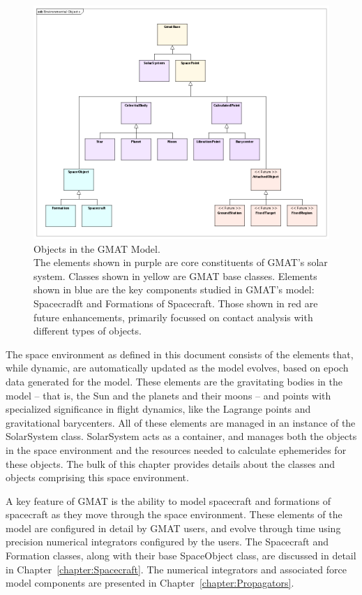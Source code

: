 \begin{figure}[htb]
\begin{center}
\includegraphics[440,347]{Images/EnvironmentalObjects.png}
\caption[Objects in the GMAT Model]{\label{figure:EnvironmentalObjects}Objects in the GMAT
Model.\\The elements shown in purple are core constituents of GMAT's solar system.  Classes
shown in yellow are GMAT base classes.  Elements shown in blue are the key components
studied in GMAT's model: Spacecradft and Formations of Spacecraft.  Those shown in red are future
enhancements, primarily focussed on contact analysis with different types of objects.}
\end{center}
\end{figure}

The space environment as defined in this document consists of the elements that, while dynamic, are
automatically updated as the model evolves, based on epoch data generated for the model.  These
elements are the gravitating bodies in the model -- that is, the Sun and the planets and their moons
-- and points with specialized significance in flight dynamics, like the Lagrange points and
gravitational barycenters.  All of these elements are managed in an instance of the SolarSystem
class. SolarSystem acts as a container, and manages both the objects in the space environment and
the resources needed to calculate ephemerides for these objects.  The bulk of this chapter provides
details about the classes and objects comprising this space environment.

A key feature of GMAT is the ability to model spacecraft and formations of spacecraft as they move
through the space environment.  These elements of the model are configured in detail by GMAT users,
and evolve through time using precision numerical integrators configured by the users.  The
Spacecraft and Formation classes, along with their base SpaceObject class, are discussed in detail
in Chapter~\ref{chapter:Spacecraft}.  The numerical integrators and associated force model
components are presented in Chapter~\ref{chapter:Propagators}.

